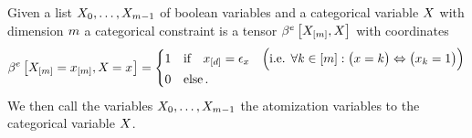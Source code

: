 \begin{definition}\label{def:catConAtomVar}
    Given a list $X_{0},\ldots,X_{m-1}$ of boolean variables and a categorical variable $X$ with dimension $m$ a categorical constraint is a tensor $\beta^{e}\left[X_{[m]},X\right]$ with coordinates
    \begin{align*}
        \beta^{e}\left[X_{[m]}=x_{[m]},X_{}=x_{}\right]
        = \begin{cases}
              1 & \text{if}\quad x_{[d]} = \epsilon_{x} \quad \Big(\text{i.e. }\forall k\in[m]: \big(x=k\big) \Leftrightarrow \big(x_{k}=1\big) \Big)\\
              0 & \text{else} \, .
        \end{cases}
    \end{align*}
    We then call the variables  $X_{0},\ldots,X_{m-1}$ the atomization variables to the categorical variable $X$.
\end{definition}

